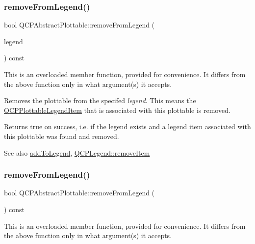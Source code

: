 \subsubsection{\texorpdfstring{remove\+From\+Legend()}{removeFromLegend()}\hspace{0.1cm}{\footnotesize\ttfamily [1/2]}}
{\footnotesize\ttfamily bool Q\+C\+P\+Abstract\+Plottable\+::remove\+From\+Legend (\begin{DoxyParamCaption}\item[{\hyperlink{class_q_c_p_legend}{Q\+C\+P\+Legend} $\ast$}]{legend }\end{DoxyParamCaption}) const}

This is an overloaded member function, provided for convenience. It differs from the above function only in what argument(s) it accepts.

Removes the plottable from the specifed {\itshape legend}. This means the \hyperlink{class_q_c_p_plottable_legend_item}{Q\+C\+P\+Plottable\+Legend\+Item} that is associated with this plottable is removed.

Returns true on success, i.\+e. if the legend exists and a legend item associated with this plottable was found and removed.

\begin{DoxySeeAlso}{See also}
\hyperlink{class_q_c_p_abstract_plottable_aa64e93cb5b606d8110d2cc0a349bb30f}{add\+To\+Legend}, \hyperlink{class_q_c_p_legend_ac91595c3eaa746fe6321d2eb952c63bb}{Q\+C\+P\+Legend\+::remove\+Item} 
\end{DoxySeeAlso}
\mbox{\label{class_q_c_p_abstract_plottable_ac95fb2604d9106d0852ad9ceb326fe8c}} 
\subsubsection{\texorpdfstring{remove\+From\+Legend()}{removeFromLegend()}\hspace{0.1cm}{\footnotesize\ttfamily [2/2]}}
{\footnotesize\ttfamily bool Q\+C\+P\+Abstract\+Plottable\+::remove\+From\+Legend (\begin{DoxyParamCaption}{ }\end{DoxyParamCaption}) const}

This is an overloaded member function, provided for convenience. It differs from the above function only in what argument(s) it accepts.

